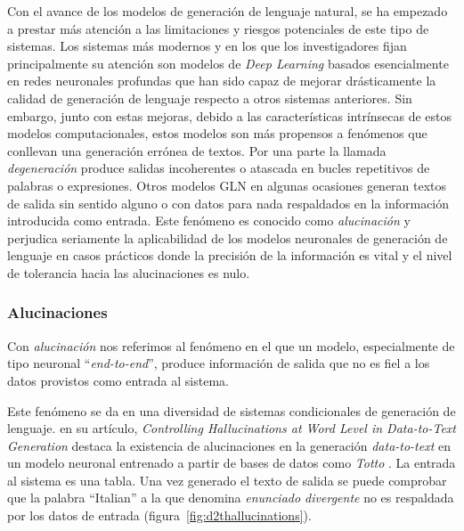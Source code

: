 Con el avance de los modelos de generación de lenguaje natural, se ha empezado a prestar más atención a las limitaciones y riesgos potenciales de este tipo de sistemas. Los sistemas más modernos y en los que los investigadores fijan principalmente su atención son modelos de \textit{Deep Learning} basados esencialmente en redes neuronales profundas que han sido capaz de mejorar drásticamente la calidad de generación de lenguaje respecto a otros sistemas anteriores. Sin embargo, junto con estas mejoras, debido a las características intrínsecas de estos modelos computacionales, estos modelos son más propensos a fenómenos que conllevan una generación errónea de textos. Por una parte la llamada \textit{degeneración} produce salidas incoherentes o atascada en bucles repetitivos de palabras o expresiones. Otros modelos GLN en algunas ocasiones generan textos de salida sin sentido alguno o con datos para nada respaldados en la información introducida como entrada. Este fenómeno es conocido como \textit{alucinación} y perjudica seriamente la aplicabilidad de los modelos neuronales de generación de lenguaje en casos prácticos donde la precisión de la información es vital y el nivel de tolerancia hacia las alucinaciones es nulo.

\subsubsection{Alucinaciones}

Con \textit{alucinación} nos referimos al fenómeno en el que un modelo, especialmente de tipo neuronal ``\textit{end-to-end}'', produce información de salida que no es fiel a los datos provistos como entrada al sistema. 

Este fenómeno se da en una diversidad de sistemas condicionales de generación de lenguaje. \cite{hallucinations_data2text} en su artículo, \textit{Controlling Hallucinations at Word Level in Data-to-Text Generation} destaca la existencia de alucinaciones en la generación \textit{data-to-text} en un modelo neuronal entrenado a partir de bases de datos como \textit{Totto} \citep{parikh-etal-2020-totto}. La entrada al sistema es una tabla. Una vez generado el texto de salida se puede comprobar que la palabra ``Italian'' a la que denomina \textit{enunciado divergente} no es respaldada por los datos de entrada (figura~\ref{fig:d2thallucinations}).

